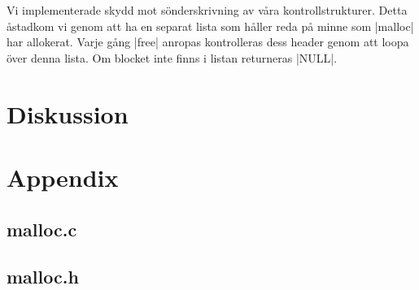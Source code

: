 \documentclass[paper=a4, fontsize=11pt]{scrartcl} %
\numberwithin{equation}{section} %
\numberwithin{figure}{section} %
\numberwithin{table}{section} %
\begin{document}
Vi implementerade skydd mot sönderskrivning av våra kontrollstrukturer. 
Detta åstadkom vi genom att ha en separat lista som håller reda på minne som
|malloc| har allokerat.
Varje gång |free| anropas kontrolleras dess header genom att loopa över denna
lista.
Om blocket inte finns i listan returneras |NULL|.




\section{Diskussion}


\newpage
\section*{Appendix}
\subsection*{malloc.c}


\newpage
\subsection*{malloc.h}

\end{document}
